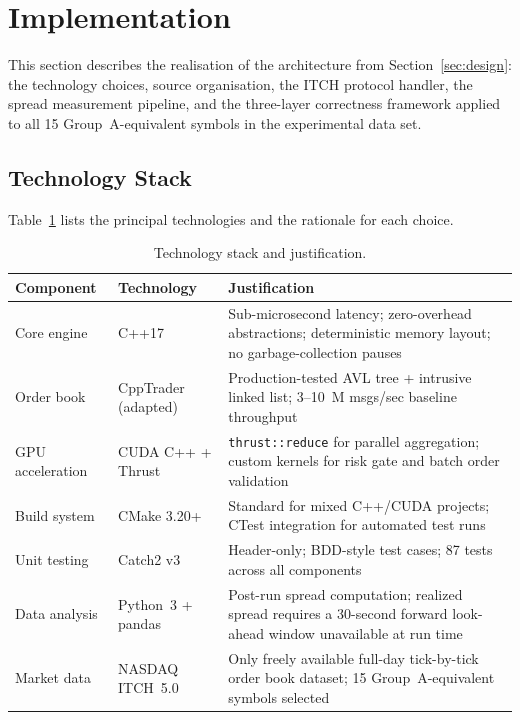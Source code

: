\documentclass[12pt]{article}
\begin{document}
\newpage

\section{Implementation}
\label{sec:impl}

This section describes the realisation of the architecture from
Section~\ref{sec:design}: the technology choices, source organisation,
the ITCH protocol handler, the spread measurement pipeline, and the
three-layer correctness framework applied to all 15 Group~A-equivalent
symbols in the experimental data set.

\subsection{Technology Stack}

Table~\ref{tab:techstack} lists the principal technologies and the
rationale for each choice.

\begin{table}[H]
\centering
\small
\caption{Technology stack and justification.}
\label{tab:techstack}
\begin{tabularx}{\textwidth}{@{}p{2.6cm}p{3.0cm}X@{}}
\toprule
\textbf{Component} & \textbf{Technology} & \textbf{Justification} \\
\midrule
Core engine & C++17 &
  Sub-microsecond latency; zero-overhead abstractions; deterministic
  memory layout; no garbage-collection pauses \\[2pt]
Order book & CppTrader~\cite{cpptrader} (adapted) &
  Production-tested AVL tree + intrusive linked list;
  3--10~M msgs/sec baseline throughput \\[2pt]
GPU acceleration & CUDA C++ + Thrust &
  \texttt{thrust::reduce} for parallel aggregation;
  custom kernels for risk gate and batch order validation \\[2pt]
Build system & CMake 3.20+ &
  Standard for mixed C++/CUDA projects;
  CTest integration for automated test runs \\[2pt]
Unit testing & Catch2 v3 &
  Header-only; BDD-style test cases; 87 tests across all components \\[2pt]
Data analysis & Python~3 + pandas &
  Post-run spread computation; realized spread requires a
  30-second forward look-ahead window unavailable at run time \\[2pt]
Market data & NASDAQ ITCH~5.0 &
  Only freely available full-day tick-by-tick order book dataset;
  15 Group~A-equivalent symbols selected \\
\bottomrule
\end{tabularx}
\end{table}
\end{document}
